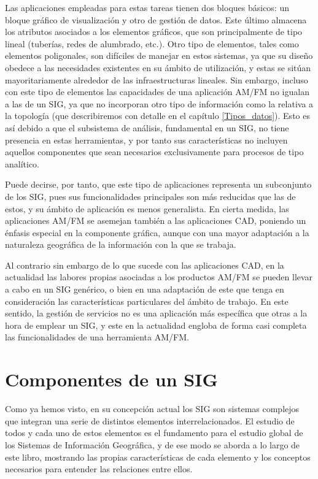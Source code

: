 Las aplicaciones empleadas para estas tareas tienen dos bloques básicos: un bloque gráfico de visualización y otro de gestión de datos. Este último almacena los atributos asociados a los elementos gráficos, que son principalmente de tipo lineal (tuberías, redes de alumbrado, etc.). Otro tipo de elementos, tales como elementos poligonales, son difíciles de manejar en estos sistemas, ya que su diseño obedece a las necesidades existentes en su ámbito de utilización, y estas se sitúan mayoritariamente alrededor de las infraestructuras lineales. Sin embargo, incluso con este tipo de elementos las capacidades de una aplicación AM/FM no igualan a las de un SIG, ya que no incorporan otro tipo de información como la relativa a la topología (que describiremos con detalle en el capítulo \ref{Tipos_datos}). Esto es así debido a que el subsistema de análisis, fundamental en un SIG, no tiene presencia en estas herramientas, y por tanto sus características no incluyen aquellos componentes que sean necesarios exclusivamente para procesos de tipo analítico.

Puede decirse, por tanto, que este tipo de aplicaciones representa un subconjunto de los SIG, pues sus funcionalidades principales son más reducidas que las de estos, y su ámbito de aplicación es menos generalista. En cierta medida, las aplicaciones AM/FM se asemejan también a las aplicaciones CAD, poniendo un énfasis especial en la componente gráfica, aunque con una mayor adaptación a la naturaleza geográfica de la información con la que se trabaja.

Al contrario sin embargo de lo que sucede con las aplicaciones CAD, en la actualidad las labores propias asociadas a los productos AM/FM se pueden llevar a cabo en un SIG genérico, o bien en una adaptación de este que tenga en consideración las características particulares del ámbito de trabajo. En este sentido, la gestión de servicios no es una aplicación más específica que otras a la hora de emplear un SIG, y este en la actualidad engloba de forma casi completa las funcionalidades de una herramienta AM/FM.

%
\section{Componentes de un SIG}

Como ya hemos visto, en su concepción actual los SIG son sistemas complejos que integran una serie de distintos elementos interrelacionados. El estudio de todos y cada uno de estos elementos es el fundamento para el estudio global de los Sistemas de Información Geográfica, y de ese modo se aborda a lo largo de este libro, mostrando las propias características de cada elemento y los conceptos necesarios para entender las relaciones entre ellos.

